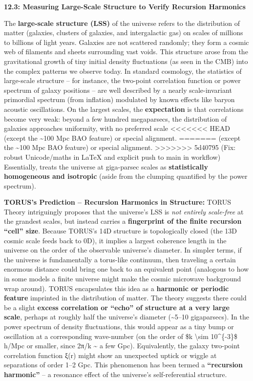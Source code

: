 \documentclass[]{article}
\begin{document}
\textbf{12.3: Measuring Large-Scale Structure to Verify Recursion
Harmonics}

The \textbf{large-scale structure (LSS)} of the universe refers to the
distribution of matter (galaxies, clusters of galaxies, and
intergalactic gas) on scales of millions to billions of light years.
Galaxies are not scattered randomly; they form a cosmic web of filaments
and sheets surrounding vast voids. This structure arose from the
gravitational growth of tiny initial density fluctuations (as seen in
the CMB) into the complex patterns we observe today. In standard \LambdaCDM
cosmology, the statistics of large-scale structure -- for instance, the
two-point correlation function or power spectrum of galaxy positions --
are well described by a nearly scale-invariant primordial spectrum (from
inflation) modulated by known effects like baryon acoustic oscillations.
On the largest scales, the \textbf{\LambdaCDM expectation} is that
correlations become very weak: beyond a few hundred megaparsecs, the
distribution of galaxies approaches uniformity, with no preferred scale
<<<<<<< HEAD
(except the \textasciitilde100 Mpc BAO feature) or special alignment.
=======
(except the \textasciitilde{}100 Mpc BAO feature) or special alignment.
>>>>>>> 5d40795 (Fix: robust Unicode/maths in LaTeX and explicit push to main in workflow)
Essentially, \LambdaCDM treats the universe at giga-parsec scales as
\textbf{statistically homogeneous and isotropic} (aside from the
clumping quantified by the power spectrum).

\textbf{TORUS's Prediction -- Recursion Harmonics in Structure:} TORUS
Theory intriguingly proposes that the universe's LSS is \emph{not
entirely scale-free} at the grandest scales, but instead carries a
\textbf{fingerprint of the finite recursion ``cell'' size}. Because
TORUS's 14D structure is topologically closed (the 13D cosmic scale
feeds back to 0D), it implies a largest coherence length in the universe
on the order of the observable universe's diameter. In simpler terms, if
the universe is fundamentally a torus-like continuum, then traveling a
certain enormous distance could bring one back to an equivalent point
(analogous to how in some models a finite universe might make the cosmic
microwave background wrap around). TORUS encapsulates this idea as a
\textbf{harmonic or periodic feature} imprinted in the distribution of
matter​. The theory suggests there could be a slight \textbf{excess
correlation or ``echo'' of structure at a very large scale}, perhaps at
roughly half the universe's diameter (\textasciitilde{}5--10
gigaparsecs)​. In the power spectrum of density fluctuations, this would
appear as a tiny bump or oscillation at a corresponding wave-number (on
the order of \$k \textbackslash{}sim 10\^{}\{-3\}\$ h/Mpc or smaller,
since 2π/k \textasciitilde{} a few Gpc). Equivalently, the galaxy
two-point correlation function ξ(r) might show an unexpected uptick or
wiggle at separations of order 1--2 Gpc​. This phenomenon has been
termed a \textbf{``recursion harmonic''} -- a resonance effect of the
universe's self-referential structure.
\end{document}
